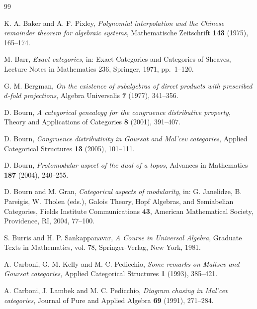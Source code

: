\documentclass[11pt,a4paper]{article}
\theoremstyle{plain}
\theoremstyle{definition}
\theoremstyle{remark}
\theoremstyle{plain}
\begin{document}
\begin{thebibliography}{99}




 K. A. Baker and A. F. Pixley, \emph{Polynomial interpolation
and the Chinese remainder theorem for algebraic systems}, Mathematische
Zeitschrift \textbf{143} (1975), 165--174.

 M. Barr, \emph{Exact categories}, in: Exact Categories and
Categories of Sheaves, Lecture Notes in Mathematics 236, Springer, 1971,
pp.~1--120.


 G. M. Bergman, \emph{On the existence of subalgebras of
direct products with prescribed $d$-fold projections}, Algebra Universalis
\textbf{7} (1977), 341--356.

 D. Bourn, \emph{A categorical genealogy for the congruence
distributive property}, Theory and Applications of Categories \textbf{8}
(2001), 391--407.

 D. Bourn, \emph{Congruence distributivity in Goursat and
Mal'cev categories}, Applied Categorical Structures \textbf{13} (2005),
101--111.

 D. Bourn, \emph{Protomodular aspect of the dual of a
topos}, Advances in Mathematics \textbf{187} (2004), 240--255.

  D. Bourn and M. Gran, \emph{Categorical aspects of
modularity}, in: G. Janelidze, B. Pareigis, W. Tholen (eds.), Galois Theory,
Hopf Algebras, and Semiabelian Categories, Fields Institute Communications
\textbf{43}, American Mathematical Society, Providence, RI, 2004, 77--100.

 S. Burris and H. P. Sankappanavar, 
\emph{A Course in Universal Algebra}, Graduate Texts in Mathematics, 
vol. 78, Springer-Verlag, New York, 1981.





 A. Carboni, G. M. Kelly and M. C. Pedicchio, \emph{Some
remarks on Maltsev and Goursat categories}, Applied Categorical Structures
\textbf{1} (1993), 385--421.

 A. Carboni, J. Lambek and M. C. Pedicchio, \emph{Diagram
chasing in Mal'cev categories}, Journal of Pure and Applied Algebra
\textbf{69} (1991), 271--284.


\end{thebibliography}
\end{document}

